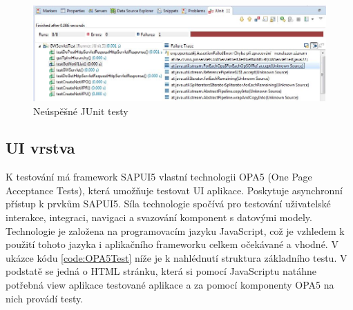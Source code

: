\documentclass[thesis=M,czech]{FITthesis}[2012/06/26]
\begin{document}
\begin{figure}[H]
	\centering
	\includegraphics[width=1\textwidth]{images/unit_test_error}
	\caption{Neúspěšné JUnit testy}
	\label{img:unit_test_error}
\end{figure}

\subsection{UI vrstva}
K testování má framework SAPUI5 vlastní technologii OPA5 (One Page Acceptance Tests), která umožňuje testovat UI aplikace. Poskytuje asynchronní přístup k prvkům SAPUI5. Síla technologie spočívá pro testování uživatelské interakce, integraci, navigaci a svazování komponent s datovými modely. Technologie je založena na programovacím jazyku JavaScript, což je vzhledem k použití tohoto jazyka i aplikačního frameworku celkem očekávané a vhodné. V ukázce kódu \ref{code:OPA5Test} níže je k nahlédnutí struktura základního testu. V podstatě se jedná o HTML stránku, která si pomocí JavaScriptu natáhne potřebná view aplikace testované aplikace a za pomocí komponenty OPA5 na nich provádí testy.
\end{document}
